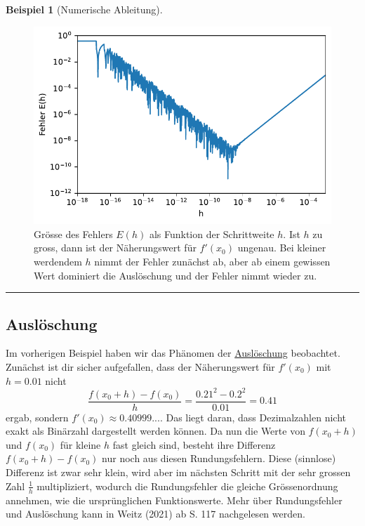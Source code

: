\documentclass[
  letterpaper,
  DIV=11,
  oneside]{scrreprt}
\theoremstyle{definition}
\theoremstyle{definition}
\newtheorem{example}{Beispiel}[chapter]
\theoremstyle{remark}
\begin{document}
\begin{example}[Numerische Ableitung]
\begin{figure}[H]
{\centering \includegraphics{./notAD_files/figure-pdf/fig-numdiffproblem-output-1.pdf}

}

\caption{\label{fig-numdiffproblem}Grösse des Fehlers \(E(h)\) als
Funktion der Schrittweite \(h\). Ist \(h\) zu gross, dann ist der
Näherungswert für \(f'(x_0)\) ungenau. Bei kleiner werdendem \(h\) nimmt
der Fehler zunächst ab, aber ab einem gewissen Wert dominiert die
Auslöschung und der Fehler nimmt wieder zu.}

\end{figure}

\end{example}

\begin{center}\rule{0.5\linewidth}{0.5pt}\end{center}

\hypertarget{ausluxf6schung}{%
\subsection{Auslöschung}\label{ausluxf6schung}}

Im vorherigen Beispiel haben wir das Phänomen der
\href{https://de.wikipedia.org/wiki/Ausl\%C3\%B6schung_(numerische_Mathematik)}{Auslöschung}
beobachtet. Zunächst ist dir sicher aufgefallen, dass der Näherungswert
für \(f'(x_0)\) mit \(h=0.01\) nicht
\[ \frac{f(x_0 + h) - f(x_0)}{h} = \frac{0.21^2 - 0.2^2}{0.01}=0.41\]
ergab, sondern \(f'(x_0)\approx 0.40999...\). Das liegt daran, dass
Dezimalzahlen nicht exakt als Binärzahl dargestellt werden können. Da
nun die Werte von \(f(x_0 + h)\) und \(f(x_0)\) für kleine \(h\) fast
gleich sind, besteht ihre Differenz \(f(x_0 + h) - f(x_0)\) nur noch aus
diesen Rundungsfehlern. Diese (sinnlose) Differenz ist zwar sehr klein,
wird aber im nächsten Schritt mit der sehr grossen Zahl \(\frac{1}{h}\)
multipliziert, wodurch die Rundungsfehler die gleiche Grössenordnung
annehmen, wie die ursprünglichen Funktionswerte. Mehr über
Rundungsfehler und Auslöschung kann in Weitz (2021) ab S. 117
nachgelesen werden.
\end{document}

